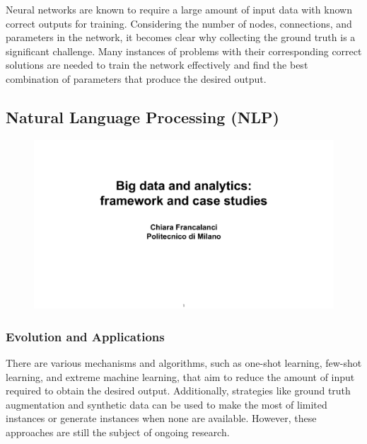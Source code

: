Neural networks are known to require a large amount of input data with
known correct outputs for training. Considering the number of nodes,
connections, and parameters in the network, it becomes clear why
collecting the ground truth is a significant challenge. Many instances
of problems with their corresponding correct solutions are needed to
train the network effectively and find the best combination of
parameters that produce the desired output.


\subsection{Natural Language Processing
  (NLP)}\label{natural-language-processing-nlp}

\begin{figure}[!h]
  \centering
  \includegraphics[page=10, trim = 1.5cm 5cm 1.5cm 4cm, clip, width=\imagewidth]{images/06 - BIG_DATA.pdf}
\end{figure}

\subsubsection{Evolution and
  Applications}\label{evolution-and-applications}

There are various mechanisms and algorithms, such as one-shot learning,
few-shot learning, and extreme machine learning, that aim to reduce the
amount of input required to obtain the desired output. Additionally,
strategies like ground truth augmentation and synthetic data can be used
to make the most of limited instances or generate instances when none
are available. However, these approaches are still the subject of
ongoing research.

